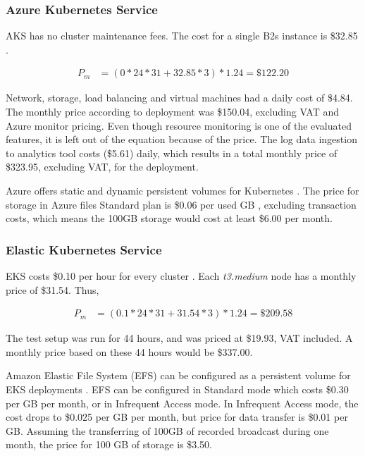 \documentclass[article]{aaltoseries}
\begin{document}
\subsubsection{Azure Kubernetes Service}

AKS has no cluster maintenance fees. The cost for a single B2s instance is \$32.85 \cite{akspricing}.

\begin{equation}
\begin{split}
    P_m &= (0 * 24 * 31 + 32.85 * 3) * 1.24 = \$122.20
\end{split}
\end{equation}

Network, storage, load balancing and virtual machines had a daily cost of \$4.84. The monthly price according to deployment was \$150.04, excluding VAT and Azure monitor pricing. Even though resource monitoring is one of the evaluated features, it is left out of the equation because of the price. The log data ingestion to analytics tool costs (\$5.61) daily, which results in a total monthly price of \$323.95, excluding VAT, for the deployment.

Azure offers static and dynamic persistent volumes for Kubernetes \cite{aksstorage}. The price for storage in Azure files Standard plan is \$0.06 per used GB \cite{aksstorageprice}, excluding transaction costs, which means the 100GB storage would cost at least \$6.00 per month.

\subsubsection{Elastic Kubernetes Service}

EKS costs \$0.10 per hour for every cluster \cite{ekspricing}. Each \textit{t3.medium} node has a monthly price of \$31.54. Thus,

\begin{equation}
\begin{split}
    P_m &= (0.1 * 24 * 31 + 31.54 * 3) * 1.24 = \$209.58
\end{split}
\end{equation}

The test setup was run for 44 hours, and was priced at \$19.93, VAT included. A monthly price based on these 44 hours would be \$337.00.

Amazon Elastic File System (EFS) can be configured as a persistent volume for EKS deployments \cite{eksstorage}. EFS can be configured in
Standard mode which costs \$0.30 per GB per month, or in Infrequent Access mode. In Infrequent Access mode, the cost drops to \$0.025 per GB per month, but price for data transfer is \$0.01 per GB. Assuming the transferring of 100GB of recorded broadcast during one month, the price for 100 GB of storage is \$3.50.
\end{document}
